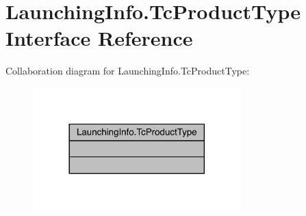 \hypertarget{interfacecom_1_1toast_1_1android_1_1gamebase_1_1launching_1_1data_1_1_launching_info_1_1_tc_product_type}{}\section{Launching\+Info.\+Tc\+Product\+Type Interface Reference}
\label{interfacecom_1_1toast_1_1android_1_1gamebase_1_1launching_1_1data_1_1_launching_info_1_1_tc_product_type}


Collaboration diagram for Launching\+Info.\+Tc\+Product\+Type\+:\nopagebreak
\begin{figure}[H]
\begin{center}
\leavevmode
\includegraphics[width=228pt]{interfacecom_1_1toast_1_1android_1_1gamebase_1_1launching_1_1data_1_1_launching_info_1_1_tc_product_type__coll__graph}
\end{center}
\end{figure}
